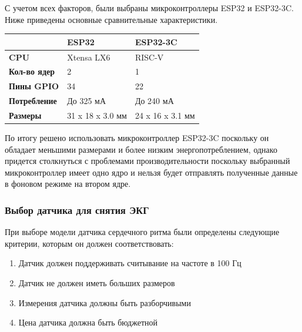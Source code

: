 \documentclass[12pt, russian]{extarticle}
\begin{document}
\begin{spacing}{1.5}
С учетом всех факторов, были выбраны микроконтроллеры ESP32 и ESP32-3C.
Ниже приведены основные сравнительные характеристики. 

\begin{center}
\begin{tabular}{|l|l|l|}
\hline
\textbf{}            & \textbf{ESP32} & \textbf{ESP32-3C} \\ \hline
\textbf{CPU}         & Xtensa LX6                             & RISC-V                                    \\ \hline
\textbf{Кол-во ядер} & 2                                      & 1                                         \\ \hline
\textbf{Пины GPIO}        & 34                                     & 22                                        \\ \hline
\textbf{Потребление} & До 325 мА                              & До 240 мА                                 \\ \hline
\textbf{Размеры}     & 31 x 18 x 3.0 мм                       & 24 x 16 x 3.1 мм                          \\ \hline
\end{tabular}
\end{center}

По итогу решено использовать микроконтроллер ESP32-3C поскольку он обладает меньшими размерами и более низким энергопотреблением, однако придется столкнуться с проблемами производительности поскольку выбранный микроконтроллер имеет одно ядро и нельзя будет отправлять полученные данные в фоновом режиме на втором ядре.

\subsubsection{Выбор датчика для снятия ЭКГ}

При выборе модели датчика сердечного ритма были определены следующие критерии, которым он должен соответствовать: 

\begin{enumerate}
    \item Датчик должен поддерживать считывание на частоте в 100 Гц
    \item Датчик не должен иметь больших размеров
    \item Измерения датчика должны быть разборчивыми
    \item Цена датчика должна быть бюджетной
\end{enumerate}


\end{spacing}
\end{document}
